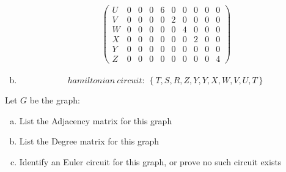 \documentclass[10pt,letterpaper, cm]{hmcpset}
\begin{document}
\begin{enumerate}[(a)]
\begin{align*}
\begin{pmatrix}
         U   & 0 & 0 & 0 & 6 & 0 & 0 & 0 & 0 & 0  \\

         V   & 0 & 0 & 0 & 0 & 2 & 0 & 0 & 0 & 0 \\

         W   & 0 & 0 & 0 & 0 & 0 & 4 & 0 & 0 & 0 \\

         X   & 0 & 0 & 0 & 0 & 0 & 0 & 2 & 0 & 0 \\

         Y   & 0 & 0 & 0 & 0 & 0 & 0 & 0 & 0 & 0 \\

         Z   & 0 & 0 & 0 & 0 & 0 & 0 & 0 & 0 & 4

      \end{pmatrix}  
              \end{align*}

  \item
    \begin{equation*}
      hamiltonian~circuit:~\left\{T, S, R, Z, Y, Y, X, W, V, U, T\right\}
    \end{equation*}
\end{enumerate}

\begin{problem}[10]
    Let $G$ be the graph:
    \begin{center}
    \end{center}

    \begin{enumerate}[(a)]
        \item List the Adjacency matrix for this graph
        \item List the Degree matrix for this graph
        \item Identify an Euler circuit for this graph, or prove no such circuit exists
    \end{enumerate}
\end{problem}
\end{document}
